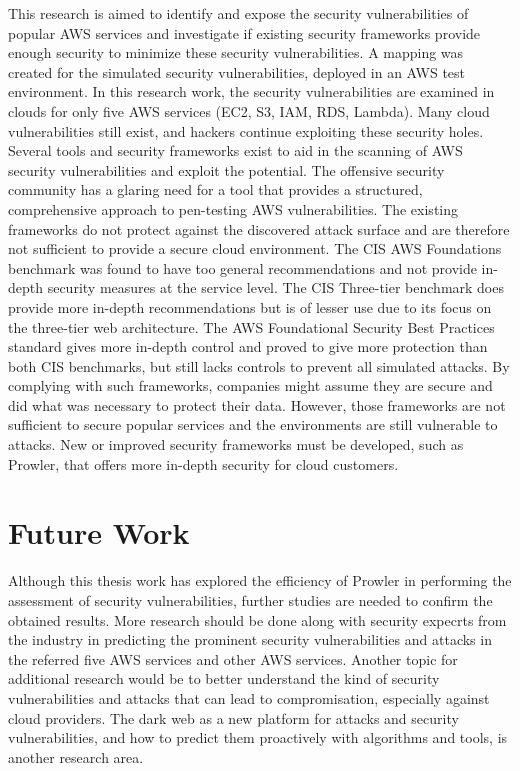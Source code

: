 \par This research is aimed to identify and expose the security vulnerabilities of popular AWS services and investigate if existing security frameworks provide enough security to minimize these security vulnerabilities. A mapping was created for the simulated security vulnerabilities, deployed in an AWS test environment. In this research work, the security vulnerabilities are examined in clouds for only five AWS services (EC2, S3, IAM, RDS, Lambda). Many cloud vulnerabilities still exist, and hackers continue exploiting these security holes. Several tools and security frameworks exist to aid in the scanning of AWS security vulnerabilities and exploit the potential. The offensive security community has a glaring need for a tool that provides a structured, comprehensive approach to pen-testing AWS vulnerabilities. The existing frameworks do not protect against the discovered attack surface and are therefore not sufficient to provide a secure cloud environment. The CIS AWS Foundations benchmark was found to have too general recommendations and not provide in-depth security measures at the service level. The CIS Three-tier benchmark does provide more in-depth recommendations but is of lesser use due to its focus on the three-tier web architecture. The AWS Foundational Security Best Practices standard gives more in-depth control and proved to give more protection than both CIS benchmarks, but still lacks controls to prevent all simulated attacks.  By complying with such frameworks, companies might assume they are secure and did what was necessary to protect their data. However, those frameworks are not sufficient to secure popular services and the environments are still vulnerable to attacks. New or improved security frameworks must be developed, such as Prowler, that offers more in-depth security for cloud customers.

\section{Future Work}

\par Although this thesis work has explored the efficiency of Prowler in performing the assessment of security vulnerabilities, further studies are needed to confirm the obtained results. More research should be done along with security expecrts from the industry in predicting the prominent security vulnerabilities and attacks in the referred five AWS services and other AWS services. Another topic for additional research would be to better understand the kind of security vulnerabilities and attacks that can lead to compromisation, especially against cloud providers. The dark web as a new platform for attacks and security vulnerabilities, and how to predict them proactively with algorithms and tools, is another research area.


